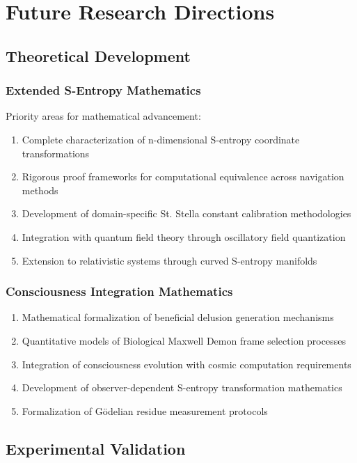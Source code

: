 \documentclass[11pt,a4paper]{article}
\theoremstyle{remark}
\begin{document}
\section{Future Research Directions}

\subsection{Theoretical Development}

\subsubsection{Extended S-Entropy Mathematics}

Priority areas for mathematical advancement:

\begin{enumerate}
\item Complete characterization of n-dimensional S-entropy coordinate transformations
\item Rigorous proof frameworks for computational equivalence across navigation methods
\item Development of domain-specific St. Stella constant calibration methodologies
\item Integration with quantum field theory through oscillatory field quantization
\item Extension to relativistic systems through curved S-entropy manifolds
\end{enumerate}

\subsubsection{Consciousness Integration Mathematics}

\begin{enumerate}
\item Mathematical formalization of beneficial delusion generation mechanisms
\item Quantitative models of Biological Maxwell Demon frame selection processes
\item Integration of consciousness evolution with cosmic computation requirements
\item Development of observer-dependent S-entropy transformation mathematics
\item Formalization of Gödelian residue measurement protocols
\end{enumerate}

\subsection{Experimental Validation}
\end{document}
